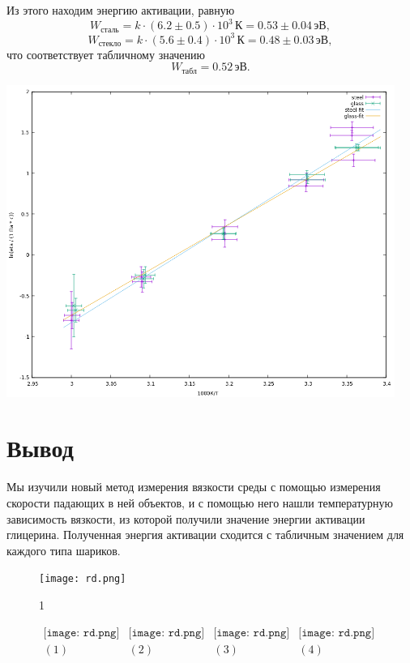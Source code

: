 Из этого находим энергию активации, равную
$$W_\text{сталь} = k \cdot (6.2 \pm 0.5) \cdot 10^3\,\text{К} = 0.53\pm0.04\,\text{эВ},$$
$$W_\text{стекло} = k \cdot (5.6 \pm 0.4) \cdot 10^3\,\text{К} = 0.48\pm0.03\,\text{эВ},$$
что соответствует табличному значению
$$W_\text{табл} = 0.52\,\text{эВ}.$$
\begin{center}
\includegraphics[width=0.95\textwidth]{plot.png}
\end{center}
\section*{Вывод}
Мы изучили новый метод измерения вязкости среды с помощью измерения скорости падающих в ней объектов, и с помощью него нашли температурную зависимость вязкости, из которой получили значение энергии активации глицерина. Полученная энергия активации сходится с табличным значением для каждого типа шариков.









\lipsum[1-4]
\begin{figure}
\centering
\texttt{[image: rd.png]}
\caption{1}
\end{figure}
\lipsum[1-6]


\begin{figure}[h]
\begin{center}$
\begin{array}{cccc}
\texttt{[image: rd.png]}&
\texttt{[image: rd.png]}&
\texttt{[image: rd.png]}&
\texttt{[image: rd.png]}\\
(1) & (2) & (3) & (4)
\end{array}$
\end{center}
\end{figure}
